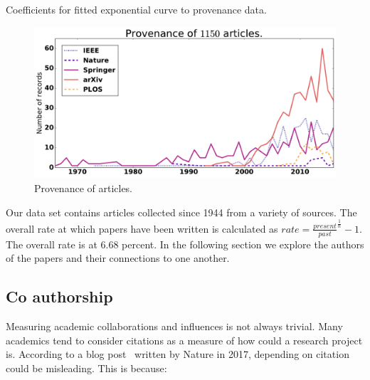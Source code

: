 \documentclass{article}
\newcommand{\uniquetitles}{}
\begin{document}
\begin{table}[!hbtp]
    \begin{center}
    
    \end{center}
    \caption{Coefficients for fitted exponential curve to provenance data.}
    \label{table:exponential_coefficients}
\end{table}


\begin{figure}[!hbtp]
    \centering
    \includegraphics[width=.6\textwidth]{./assets/images/provenance.pdf}
    \caption{Provenance of articles.}
    \label{fig:provenance}
\end{figure}

Our data set contains \uniquetitles articles collected since 1944 from a variety
of sources. The overall rate at which papers have been written is calculated
as \(rate = \frac{present}{past}^{\frac{1}{n}} - 1\). The overall rate is at 6.68
percent.
In the following section we explore
the authors of the papers and their connections to one another.

\subsection{Co authorship}


Measuring academic collaborations and influences is not always trivial. Many
academics tend to consider citations as a measure of how could a research project
is. According to a blog post~\cite{nature_blog} written by Nature in 2017,
depending on citation could be misleading. This is because:
\end{document}
